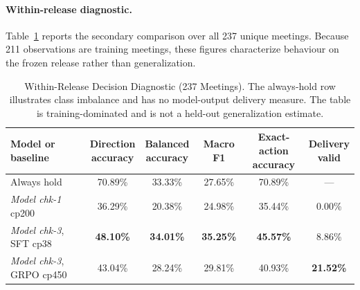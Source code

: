 \paragraph*{Within-release diagnostic.}
Table~\ref{tab:ch2:decision_all237} reports the secondary comparison over all
237 unique meetings. Because 211 observations are training meetings, these
figures characterize behaviour on the frozen release rather than
generalization.

\begin{table}[htbp]
    \centering
    \footnotesize
    \setlength{\tabcolsep}{4pt}
    \begin{tabularx}{\textwidth}{@{}>{\raggedright\arraybackslash}Xccccc@{}}
        \toprule
        \textbf{Model or baseline} & \makecell{\textbf{Direction}\\\textbf{accuracy}} &
        \makecell{\textbf{Balanced}\\\textbf{accuracy}} &
        \textbf{Macro F1} & \makecell{\textbf{Exact-action}\\\textbf{accuracy}} &
        \makecell{\textbf{Delivery}\\\textbf{valid}} \\
        \midrule
        Always hold & 70.89\% & 33.33\% & 27.65\% & 70.89\% & --- \\
        \textit{Model chk-1} cp200 & 36.29\% & 20.38\% & 24.98\% & 35.44\% & 0.00\% \\
        \textit{Model chk-3}, SFT cp38 & \textbf{48.10\%} & \textbf{34.01\%} & \textbf{35.25\%} & \textbf{45.57\%} & 8.86\% \\
        \textit{Model chk-3}, GRPO cp450 & 43.04\% & 28.24\% & 29.81\% & 40.93\% & \textbf{21.52\%} \\
        \bottomrule
    \end{tabularx}
    \caption{Within-Release Decision Diagnostic (237 Meetings). The always-hold row illustrates class imbalance and has no model-output delivery measure. The table is training-dominated and is not a held-out generalization estimate.}
    \label{tab:ch2:decision_all237}
\end{table}

